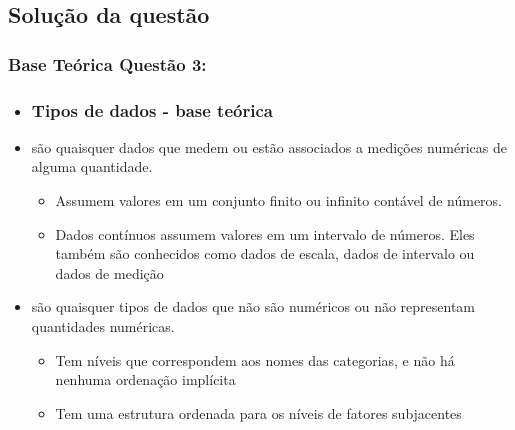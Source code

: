 \documentclass[a4paper,11pt]{article}
\begin{document}
\subsection*{Solução da questão} 					

\subsubsection*{Base Teórica Questão 3:} 

\begin{itemize}
\item[]

\subsubsection*{Tipos de dados - base teórica} 

\item {} são quaisquer dados que medem ou estão associados a medições numéricas de alguma quantidade.
    \begin{itemize}
        \item {} Assumem valores em um conjunto finito ou infinito contável de números.
        \item {} Dados contínuos assumem valores em um intervalo de números. Eles também são conhecidos como dados de escala, dados de intervalo ou dados de medição
    \end{itemize}
    \item {} são quaisquer tipos de dados que não são numéricos ou não representam quantidades numéricas.
    \begin{itemize}
        \item {} Tem níveis que correspondem aos nomes das categorias, e não há nenhuma ordenação implícita
        \item {} Tem uma estrutura ordenada para os níveis de fatores subjacentes
    \end{itemize}

    
\end{itemize}



\newpage
\begin{appendices}


\end{appendices}
\end{document}
